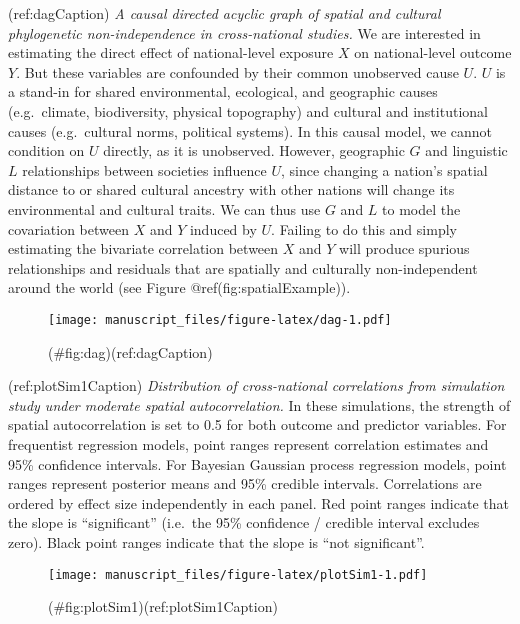 \begin{appendix}
(ref:dagCaption) \emph{A causal directed acyclic graph of spatial and
cultural phylogenetic non-independence in cross-national studies.} We
are interested in estimating the direct effect of national-level
exposure \(X\) on national-level outcome \(Y\). But these variables are
confounded by their common unobserved cause \(U\). \(U\) is a stand-in
for shared environmental, ecological, and geographic causes
(e.g.~climate, biodiversity, physical topography) and cultural and
institutional causes (e.g.~cultural norms, political systems). In this
causal model, we cannot condition on \(U\) directly, as it is
unobserved. However, geographic \(G\) and linguistic \(L\) relationships
between societies influence \(U\), since changing a nation's spatial
distance to or shared cultural ancestry with other nations will change
its environmental and cultural traits. We can thus use \(G\) and \(L\)
to model the covariation between \(X\) and \(Y\) induced by \(U\).
Failing to do this and simply estimating the bivariate correlation
between \(X\) and \(Y\) will produce spurious relationships and
residuals that are spatially and culturally non-independent around the
world (see Figure @ref(fig:spatialExample)).

\begin{figure}
\centering
\texttt{[image: manuscript\_files/figure-latex/dag-1.pdf]}
\caption{(\#fig:dag)(ref:dagCaption)}
\end{figure}

\newpage

(ref:plotSim1Caption) \emph{Distribution of cross-national correlations
from simulation study under moderate spatial autocorrelation.} In these
simulations, the strength of spatial autocorrelation is set to 0.5 for
both outcome and predictor variables. For frequentist regression models,
point ranges represent correlation estimates and 95\% confidence
intervals. For Bayesian Gaussian process regression models, point ranges
represent posterior means and 95\% credible intervals. Correlations are
ordered by effect size independently in each panel. Red point ranges
indicate that the slope is ``significant'' (i.e.~the 95\% confidence /
credible interval excludes zero). Black point ranges indicate that the
slope is ``not significant''.

\begin{figure}
\centering
\texttt{[image: manuscript\_files/figure-latex/plotSim1-1.pdf]}
\caption{(\#fig:plotSim1)(ref:plotSim1Caption)}
\end{figure}


\end{appendix}
